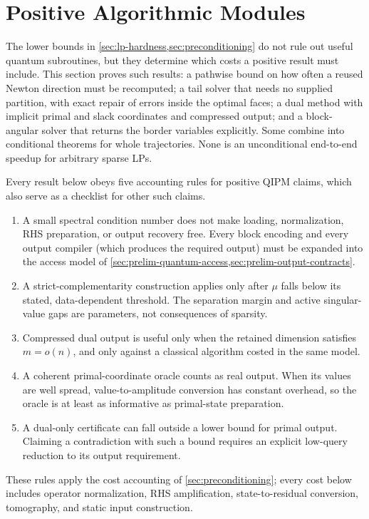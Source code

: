\section{Positive Algorithmic Modules}
\label{sec:positive-modules}

The lower bounds in \cref{sec:lp-hardness,sec:preconditioning} do not rule out
useful quantum subroutines, but they determine which costs a positive result
must include.  This section proves such results: a pathwise bound on how often a
reused Newton direction must be recomputed; a tail solver that needs no
supplied partition, with exact repair of errors inside the optimal faces; a
dual method with implicit primal and slack coordinates and compressed output;
and a block-angular solver that returns the border variables explicitly.  Some
combine into conditional theorems for whole trajectories.  None is an
unconditional end-to-end speedup for arbitrary sparse LPs.

Every result below obeys five accounting rules for positive QIPM claims,
which also serve as a checklist for other such claims.
\begin{enumerate}[leftmargin=*]
 \item A small spectral condition number does not make loading, normalization,
 RHS preparation, or output recovery free.  Every block encoding and every
 output compiler (which produces the required output) must be expanded
 into the access model of
 \cref{sec:prelim-quantum-access,sec:prelim-output-contracts}.
 \item A strict-complementarity construction applies only after $\mu$ falls
 below its stated, data-dependent threshold.  The separation margin and active
 singular-value gaps are parameters, not consequences of sparsity.
 \item Compressed dual output is useful only when the retained dimension
 satisfies $m=o(n)$, and only against a classical algorithm costed in the same
 model.
 \item A coherent primal-coordinate oracle counts as real output.  When its
 values are well spread, value-to-amplitude conversion has constant overhead,
 so the oracle is at least as informative as primal-state preparation.
 \item A dual-only certificate can fall outside a lower bound for primal
 output.  Claiming a contradiction with such a bound requires
 an explicit low-query reduction to its output requirement.
\end{enumerate}
These rules apply the cost accounting of \cref{sec:preconditioning}; every
cost below includes operator normalization, RHS amplification, state-to-residual
conversion, tomography, and static input construction.

